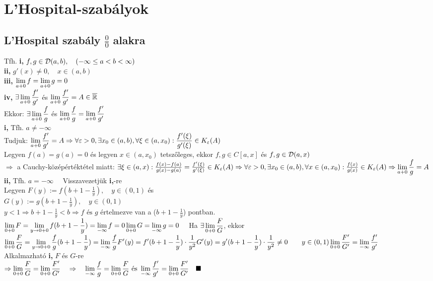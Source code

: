 \documentclass[a4paper,11pt]{article}
\begin{document}
\section{L'Hospital-szabályok}
\subsection{L'Hospital szabály $\frac{0}{0}$ alakra}
\tetel Tfh. \textbf{i,} $f,g\in\displaystyle\mathcal{D}(a,b),\quad(-\infty\leq a<b<\infty)$\\[0.2cm]\hspace*{2cm}
\textbf{ii,} $g'(x)\neq0,\quad x\in(a,b)$\\[0.2cm]\hspace*{2.1cm}\textbf{iii,} $\displaystyle\lim_{a+0} f=\displaystyle\lim_{a+0}
g=0$\\[0.2cm]\hspace*{2.1cm}\textbf{iv,} $\exists\displaystyle\lim_{a+0} \frac{f'}{g'}$ és
$\displaystyle\lim_{a+0}\frac{f'}{g'}=A\in\overline{\mathbb{R}}$\\[0.2cm] Ekkor: $\exists\displaystyle\lim_{a+0} \frac{f}{g}$ és
$\displaystyle\lim_{a+0}\frac{f}{g}=\displaystyle\lim_{a+0}\frac{f'}{g'}$\\[0.2cm]\biz\textbf{i,} Tfh.
$a\neq-\infty$\\[0.2cm]Tudjuk: $\displaystyle\lim_{a+0}\frac{f'}{g'}=A\Rightarrow\forall \varepsilon>0,
\exists x_0\in(a,b),\forall\xi\in(a,x_0):\frac{f'(\xi)}{g'(\xi)}
\in K_{\varepsilon}(A)$\\[0.2cm]Legyen $f(a)=g(a)=0$ és legyen $x\in(a,x_0)$
tetszőleges, ekkor $f,g\in C[a,x]$ és $f,g\in\displaystyle\mathcal{D}(a,x)$\\[0.2cm]$\Rightarrow$ a
Cauchy-középértéktétel miatt: $\exists\xi\in(a,x):\frac{f(x)-f(a)}{g(x)-g(a)}=
\frac{f'(\xi)}{g'(\xi)}\in K_{\varepsilon}(A)\\[0.2cm]\Rightarrow\forall\varepsilon >0,\exists
x_0\in(a,b),\forall x\in(a,x_0):\frac{f(x)}{g(x)}\in K_{\varepsilon}(A)
\Rightarrow\displaystyle\lim_{a+0}\frac{f}{g}=A$\\[0.2cm]\textbf{ii,} Tfh. $a=-\infty\quad$
Visszavezetjük \textbf{i,}-re\\[0.1cm]Legyen $F(y):=f(b+1-\frac{1}{y}),\quad
y\in(0,1)$ és\\[0.1cm]$G(y):=g(b+1-\frac{1}{y}),\quad y\in(0,1)$\\[0.1cm]$y<1
\Rightarrow b+1-\frac{1}{y}<b\Rightarrow f\text{ és }g$ értelmezve van a
($b+1- \frac{1}{y}$) pontban.\\[0.1cm]$\displaystyle\lim_{0+0} F=\lim\limits_{y\to0+0}f(b+1-
\frac{1}{y})=\lim\limits_{-\infty} f=0\\[0.2cm]\displaystyle\lim_{0+0} G=\lim\limits_{-\infty}
g=0\quad$ Ha $\exists\displaystyle\lim_{0+0}\frac{F}{G}$, ekkor\\[0.2cm]$
\displaystyle\lim_{0+0}\frac{F}{G}=\lim\limits_{y\to0+0}\frac{f}{g}(b+1-\frac{1}{y})=
\lim\limits_{-\infty}\frac{f}{g}\\[0.2cm]F'(y)=f'(b+1-\frac{1}{y})\cdot
\frac{1}{y^2}\\[0.2cm]G'(y)=g'(b+1-\frac{1}{y})\cdot\frac{1}{y^2}
\neq0\quad\quad y\in(0,1)\\[0.2cm]\displaystyle\lim_{0+0}\frac{F'}{G'}= \lim\limits_{-\infty}\frac{f'}{g'}\hspace{1.5cm}$ Alkalmazható \textbf{i,}
$F$ és $G$-re\\[0.2cm]$\Rightarrow\displaystyle\lim_{0+0}\frac{F}{G}=\displaystyle\lim_{0+0}\frac{F'}{G'}
\quad\Rightarrow\quad\lim\limits_{-\infty}\frac{f}{g}=\displaystyle\lim_{0+0}\frac{F}{G} \text{ és }
\lim\limits_{-\infty}\frac{f'}{g'}=\displaystyle\lim_{0+0}
\frac{F'}{G'}\quad\blacksquare$\newpage
\end{document}
